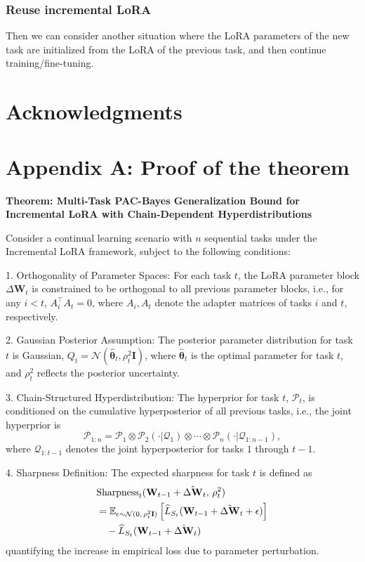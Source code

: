 \documentclass[letterpaper]{article} %
\begin{document}
\subsubsection{Reuse incremental LoRA}
Then we can consider another situation where the LoRA parameters of the new task are initialized from the LoRA of the previous task, and then continue training/fine-tuning.




\section{Acknowledgments}





\appendix

\section{Appendix A: Proof of the theorem}

\textbf{Theorem: Multi-Task PAC-Bayes Generalization Bound for Incremental LoRA with Chain-Dependent Hyperdistributions}


Consider a continual learning scenario with $n$ sequential tasks under the Incremental LoRA framework, subject to the following conditions:

1. Orthogonality of Parameter Spaces: For each task $t$, the LoRA parameter block $\Delta\mathbf{W}_t$ is constrained to be orthogonal to all previous parameter blocks, i.e., for any $i < t$, $A_i^\top A_t = 0$, where $A_i, A_t$ denote the adapter matrices of tasks $i$ and $t$, respectively.

2. Gaussian Posterior Assumption: The posterior parameter distribution for task $t$ is Gaussian, $Q_t = \mathcal{N}(\hat{\boldsymbol{\theta}}_t, \rho_t^2 \mathbf{I})$, where $\hat{\boldsymbol{\theta}}_t$ is the optimal parameter for task $t$, and $\rho_t^2$ reflects the posterior uncertainty.

3. Chain-Structured Hyperdistribution: The hyperprior for task $t$, $\mathcal{P}_t$, is conditioned on the cumulative hyperposterior of all previous tasks, i.e., the joint hyperprior is
   $$
   \mathcal{P}_{1:n} = \mathcal{P}_1 \otimes \mathcal{P}_2(\cdot|\mathcal{Q}_1) \otimes \cdots \otimes \mathcal{P}_n(\cdot|\mathcal{Q}_{1:n-1}),
   $$ where $\mathcal{Q}_{1:t-1}$ denotes the joint hyperposterior for tasks $1$ through $t-1$.

4. Sharpness Definition: The expected sharpness for task $t$ is defined as
\begin{align}
&\mathrm{Sharpness}_t(\mathbf{W}_{t-1} + \hat{\Delta\mathbf{W}}_t,\, \rho_t^2) \notag\\
& = \mathbb{E}_{\epsilon \sim \mathcal{N}(0,\, \rho_t^2 \mathbf{I})}
\left[ \widehat{L}_{S_t}(\mathbf{W}_{t-1} + \hat{\Delta\mathbf{W}}_t + \epsilon) \right] \notag\\
&\quad - \widehat{L}_{S_t}(\mathbf{W}_{t-1} + \hat{\Delta\mathbf{W}}_t) \notag
\end{align}
quantifying the increase in empirical loss due to parameter perturbation.
\end{document}

